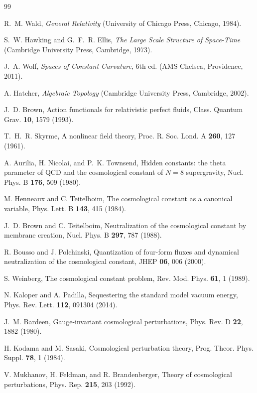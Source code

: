 \documentclass[
  aps,
  prd,
  reprint,
  superscriptaddress,
  floatfix,
  nofootinbib,
  longbibliography
]{revtex4-2}
\theoremstyle{plain}
\theoremstyle{definition}
\theoremstyle{remark}
\begin{document}
\begin{thebibliography}{99}

R.~M. Wald, \emph{General Relativity} (University of Chicago Press, Chicago, 1984).

S.~W. Hawking and G.~F.~R. Ellis, \emph{The Large Scale Structure of Space-Time} (Cambridge University Press, Cambridge, 1973).

J.~A. Wolf, \emph{Spaces of Constant Curvature}, 6th ed. (AMS Chelsea, Providence, 2011).

A. Hatcher, \emph{Algebraic Topology} (Cambridge University Press, Cambridge, 2002).

J.~D. Brown, Action functionals for relativistic perfect fluids,
Class. Quantum Grav. \textbf{10}, 1579 (1993).

T.~H.~R. Skyrme, A nonlinear field theory,
Proc. R. Soc. Lond. A \textbf{260}, 127 (1961).

A. Aurilia, H. Nicolai, and P.~K. Townsend,
Hidden constants: the theta parameter of QCD and the cosmological constant of \(N=8\) supergravity,
Nucl. Phys. B \textbf{176}, 509 (1980).

M. Henneaux and C. Teitelboim,
The cosmological constant as a canonical variable,
Phys. Lett. B \textbf{143}, 415 (1984).

J.~D. Brown and C. Teitelboim,
Neutralization of the cosmological constant by membrane creation,
Nucl. Phys. B \textbf{297}, 787 (1988).

R. Bousso and J. Polchinski,
Quantization of four-form fluxes and dynamical neutralization of the cosmological constant,
JHEP \textbf{06}, 006 (2000).

S. Weinberg, The cosmological constant problem,
Rev. Mod. Phys. \textbf{61}, 1 (1989).

N. Kaloper and A. Padilla,
Sequestering the standard model vacuum energy,
Phys. Rev. Lett. \textbf{112}, 091304 (2014).

J.~M. Bardeen,
Gauge-invariant cosmological perturbations,
Phys. Rev. D \textbf{22}, 1882 (1980).

H. Kodama and M. Sasaki,
Cosmological perturbation theory,
Prog. Theor. Phys. Suppl. \textbf{78}, 1 (1984).

V. Mukhanov, H. Feldman, and R. Brandenberger,
Theory of cosmological perturbations,
Phys. Rep. \textbf{215}, 203 (1992).


\end{thebibliography}
\end{document}
